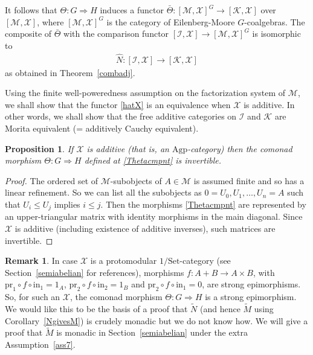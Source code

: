 \documentclass[a4paper,12pt,reqno]{amsart}
\newtheorem{proposition}[theorem]{Proposition}
\theoremstyle{definition}
\newtheorem{remark}[theorem]{Remark}
\theoremstyle{fact}
\theoremstyle{genquest}
\theoremstyle{step}
\newcommand{\dd}{\colon}
\newcommand{\lra}{\longrightarrow}
\newcommand{\ra}{\rightarrow}
\def\CI{{\mathscr I}}
\def\CK{{\mathscr K}}
\def\CM{{\mathscr M}}
\def\CX{{\mathscr X}}
\begin{document}
It follows that $\Theta \dd G\Rightarrow H$
induces a functor $\bar{\Theta} \dd [\CM,\CX]^G \ra [\CK,\CX]$ over $[\CM,\CX]$, 
where $[\CM,\CX]^G$ is the category of Eilenberg-Moore $G$-coalgebras.  
The composite of $\bar{\Theta}$ with the comparison functor 
$[\CI,\CX] \lra [\CM,\CX]^G$ is isomorphic to  
\begin{eqnarray}\label{hatX}
\widehat{N} \dd [\CI, \CX] \lra [\CK, \CX]
\end{eqnarray}
as obtained in Theorem~\ref{combadj}.

Using the finite well-poweredness assumption on the factorization system of $\CM$, 
we shall show that the functor \eqref{hatX} is an equivalence when $\CX$ is additive.
In other words, we shall show that the free additive categories on
$\CI$ and $\CK$ are Morita equivalent (= additively Cauchy equivalent).

\begin{proposition}\label{invTheta}
If $\CX$ is additive (that is, an $\mathrm{Agp}$-category) then the comonad 
morphism $\Theta \dd G\Rightarrow H$ defined at \eqref{Thetacmpnt} is invertible.
\end{proposition}
\begin{proof}
The ordered set of $\CM$-subobjects of $A \in \CM$ is assumed finite
and so has a linear refinement. 
So we can list all the subobjects as $0=U_0, U_1, \dots , U_n = A$ 
such that $U_i \le U_j$ implies $i \le j$.
Then the morphisms \eqref{Thetacmpnt} are represented by an
upper-triangular matrix with identity morphisms in the main diagonal.
Since $\CX$ is additive (including existence of additive inverses), such
matrices are invertible.
\end{proof}

\begin{remark} In case $\CX$ is a protomodular $1/\mathrm{Set}$-category 
(see Section~\ref{semiabelian} for references), 
morphisms $f \dd A+B \ra A\times B$, with 
$\mathrm{pr}_1\circ f \circ \mathrm{in}_1 = 1_A$, 
$\mathrm{pr}_2\circ f \circ \mathrm{in}_2 = 1_B$ and $\mathrm{pr}_2\circ f \circ \mathrm{in}_1 = 0$, 
are strong epimorphisms. 
So, for such an $\CX$, the comonad morphism $\Theta \dd G\Rightarrow H$ is a strong epimorphism. 
We would like this to be the basis of a proof that $\widetilde{N}$ (and hence 
$\widetilde{M}$ using Corollary~\ref{NgivesM}) 
is crudely monadic but we do not know how. 
We will give a proof that $\widetilde{M}$ is monadic in Section~\ref{semiabelian}
under the extra Assumption~\ref{ass7}.
\end{remark}
\end{document}
